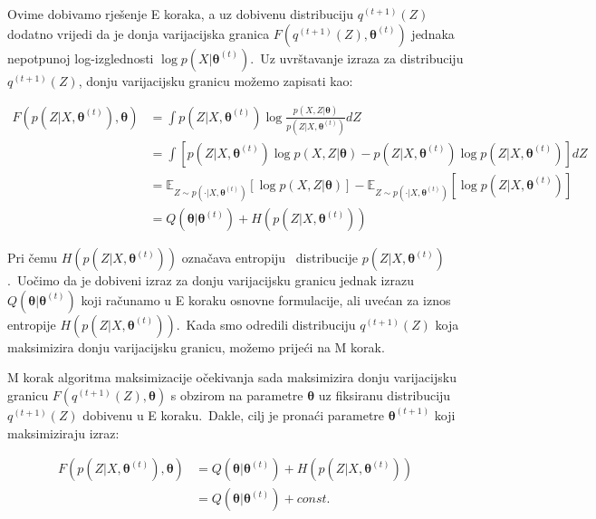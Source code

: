 \documentclass[diplomskirad]{fer}
\begin{document}
Ovime dobivamo rješenje E koraka, a uz dobivenu distribuciju $q^{(t + 1)}(Z)$ dodatno vrijedi da je donja varijacijska granica $F(q^{(t + 1)}(Z), \bm{\theta}^{(t)})$ jednaka nepotpunoj log-izglednosti $\log p(X | \bm{\theta}^{(t)})$.\ 
Uz uvrštavanje izraza za distribuciju $q^{(t + 1)}(Z)$, donju varijacijsku granicu možemo zapisati kao:

\begin{equation}
  \begin{aligned}
    F(p(Z | X, \bm{\theta}^{(t)}), \bm{\theta}) &= \int p(Z | X, \bm{\theta}^{(t)}) \log \frac{p(X, Z | \bm{\theta})}{p(Z | X, \bm{\theta}^{(t)})} dZ \\
                         &= \int \left[ p(Z | X, \bm{\theta}^{(t)}) \log p(X, Z | \bm{\theta}) - p(Z | X, \bm{\theta}^{(t)}) \log p(Z | X, \bm{\theta}^{(t)}) \right] dZ \\
                         &= \mathbb{E}_{Z \sim p(\cdot | X, \bm{\theta}^{(t)})} \left[ \log p(X, Z | \bm{\theta}) \right] - \mathbb{E}_{Z \sim p(\cdot | X, \bm{\theta}^{(t)})} \left[\log p(Z | X, \bm{\theta}^{(t)}) \right] \\
                         &= Q(\bm{\theta} | \bm{\theta}^{(t)}) + H(p(Z | X, \bm{\theta}^{(t)}))
  \end{aligned}
  \label{eq:em_equality_of_e_step}
\end{equation}

Pri čemu $H(p(Z | X, \bm{\theta}^{(t)}))$ označava entropiju~\cite{renyi1961measures} distribucije $p(Z | X, \bm{\theta}^{(t)})$.\ Uočimo da je dobiveni izraz za donju varijacijsku granicu jednak izrazu $Q(\bm{\theta} | \bm{\theta}^{(t)})$ koji računamo u E koraku osnovne formulacije, ali uvećan za iznos entropije $H(p(Z | X, \bm{\theta}^{(t)}))$.\ 
Kada smo odredili distribuciju $q^{(t + 1)}(Z)$ koja maksimizira donju varijacijsku granicu, možemo prijeći na M korak.\ 

M korak algoritma maksimizacije očekivanja sada maksimizira donju varijacijsku granicu $F(q^{(t + 1)}(Z), \bm{\theta})$ s obzirom na parametre $\bm{\theta}$ uz fiksiranu distribuciju $q^{(t + 1)}(Z)$ dobivenu u E koraku.\
Dakle, cilj je pronaći parametre $\bm{\theta}^{(t + 1)}$ koji maksimiziraju izraz:

\begin{equation}
  \begin{aligned}
    F(p(Z | X, \bm{\theta}^{(t)}), \bm{\theta}) &= Q(\bm{\theta} | \bm{\theta}^{(t)}) + H(p(Z | X, \bm{\theta}^{(t)})) \\ 
                                                &= Q(\bm{\theta} | \bm{\theta}^{(t)}) + const. \\
  \end{aligned}
  \label{eq:em_m_step_general}
\end{equation}
\end{document}
